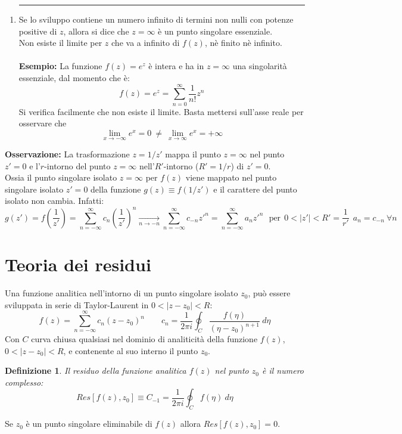 \documentclass[twoside]{article}
\newtheorem{definition}{Definizione}[section]
\begin{document}
\begin{enumerate}
    \item
    \rule{\textwidth}{0.7pt}
    Se lo sviluppo contiene un numero infinito di termini non nulli con potenze positive di $z$, allora si dice che $z=\infty$ è un punto singolare essenziale.
    \\
    Non esiste il limite per $z$ che va a infinito di $f(z)$, nè finito nè infinito.
    \\ \\
    \textbf{Esempio:} La funzione $f(z)=e^z$ è intera e ha in $z=\infty$ una singolarità essenziale, dal momento che è:
    \begin{equation}
        f(z)=e^z=\sum_{n=0}^{\infty}\frac{1}{n!}z^n
    \end{equation}
    Si verifica facilmente che non esiste il limite. Basta mettersi sull'asse reale per osservare che
    \begin{equation}
        \lim_{x\to -\infty}e^x=0 \ \ne \ \lim_{x\to \infty}e^x=+\infty
    \end{equation}
\end{enumerate}

\textbf{Osservazione:} La trasformazione $z=1/z'$ mappa il punto $z=\infty$ nel punto $z'=0$ e l'$r$-intorno del punto $z=\infty$ nell'$R'$-intorno ($R'=1/r$) di $z'=0$.
\\
Ossia il punto singolare isolato $z=\infty$ per $f(z)$ viene mappato nel punto singolare isolato $z'=0$ della funzione $g(z)\equiv f(1/z')$ e il carattere del punto isolato non cambia. Infatti:
\begin{equation*}
    g(z')=f\left(\frac{1}{z'}\right)=\sum_{n=-\infty}^{\infty}c_n\left(\frac{1}{z'}\right)^n   \xrightarrow[n \rightarrow -n] \  \sum_{n=-\infty}^{\infty} c_{-n}z'^n=\sum_{n=-\infty}^{\infty}a_n z'^n \ \ \ \text{per} \ \ 0<|z'|<R'=\frac{1}{r'} \ \ a_n=c_{-n} \ \forall n
\end{equation*}

\newpage
\setcounter{section}{10}
\section{Teoria dei residui}
Una funzione analitica nell'intorno di un punto singolare isolato $z_0$, può essere sviluppata in serie di Taylor-Laurent in $0<|z-z_0|<R$:
\begin{equation}
    f(z)=\sum_{n=-\infty}^\infty c_n(z-z_0)^n \qquad c_n=\frac{1}{2\pi i}\oint_C \frac{f(\eta)}{(\eta-z_0)^{n+1}} \ d\eta
\end{equation}
Con $C$ curva chiusa qualsiasi nel dominio di analiticità della funzione $f(z)$, $0<|z-z_0|<R$, e contenente al suo interno il punto $z_0$.\\
\begin{definition}
Il \textit{residuo} della funzione analitica $f(z)$ nel punto $z_0$ è il numero complesso:
\begin{equation}
    Res[f(z),z_0]\equiv C_{-1}=\frac{1}{2\pi i}\oint_C f(\eta)\ d\eta
\end{equation}
\end{definition}
Se $z_0$ è un punto singolare eliminabile di $f(z)$ allora $Res[f(z),z_0]=0$.\\
\end{document}

